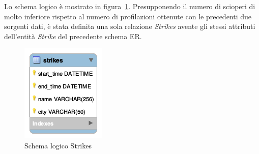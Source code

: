 Lo schema logico è mostrato in figura~\ref{fig:strikes_logic}.
Presupponendo il numero di scioperi di molto inferiore rispetto al numero di profilazioni
ottenute con le precedenti due sorgenti dati, è stata definita una sola relazione
\textit{Strikes} avente gli stessi attributi dell'entità \textit{Strike} del precedente 
schema ER.

\begin{figure}                                                                                                                                                            
\centering                                                                                                                                                                   
\includegraphics{diagrams/strikes_logic}                                                                                                                                   
\caption{Schema logico Strikes}                                                                                                                                            
\label{fig:strikes_logic}                                                                                                                                                           
\end{figure}
